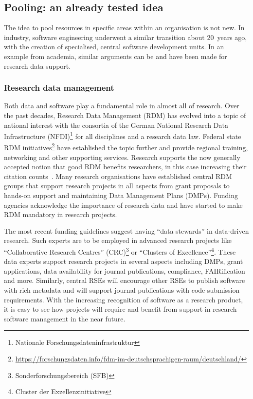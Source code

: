 \documentclass[a4paper]{article}
\begin{document}
\subsection{Pooling: an already tested idea}
The idea to pool resources in specific areas within an organisation is not new.
In industry, software engineering underwent a similar transition about 20 years ago, with the creation of specialised, central software development units.
In an example from academia, similar arguments can be and have been made for research data support.

\subsubsection{Research data management}
Both data and software play a fundamental role in almost all of research.
Over the past decades, Research Data Management (RDM) has evolved into a topic of national interest with the consortia of the German National Research Data Infrastructure (NFDI)\footnote{Nationale Forschungsdateninfrastruktur} for all disciplines and a research data law.
Federal state RDM initiatives\footnote{\url{https://forschungsdaten.info/fdm-im-deutschsprachigen-raum/deutschland/}} have established the topic further and provide regional training, networking and other supporting services.
Research supports the now generally accepted notion that good RDM benefits researchers, in this case increasing their citation counts~\autocite{The_citation_advantage_of_linking_publications_to_research_data}.
Many research organisations have established central RDM groups that support research projects in all aspects from grant proposals to hands-on support and maintaining Data Management Plans (DMPs).
Funding agencies acknowledge the importance of research data and have started to make RDM mandatory in research projects.

The most recent funding guidelines suggest having “data stewards” in data-driven research.
Such experts are to be employed in advanced research projects like “Collaborative Research Centres” (CRC)\footnote{Sonderforschungsbereich (SFB)} or “Clusters of Excellence”\footnote{Cluster der Exzellenzinitiative}.
These data experts support research projects in several aspects including DMPs, grant applications, data availability for journal publications, compliance, FAIRification and more.
Similarly, central RSEs will encourage other RSEs to publish software with rich metadata and will support journal publications with code submission requirements.
With the increasing recognition of software as a research product, it is easy to see how projects will require and benefit from support in research software management in the near future.
\end{document}
